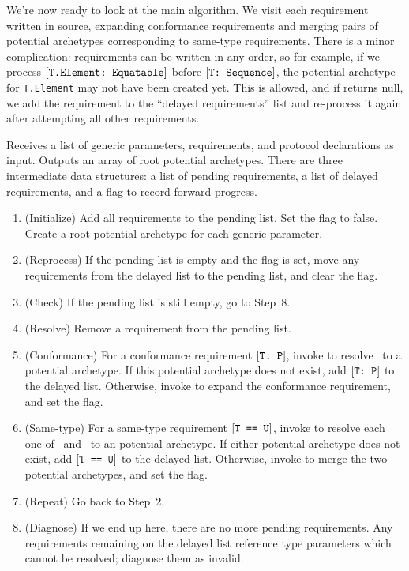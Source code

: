 \documentclass[../generics]{subfiles}
\begin{document}
We're now ready to look at the main algorithm. We visit each requirement written in source, expanding conformance requirements and merging pairs of potential archetypes corresponding to same-type requirements. There is a minor complication: requirements can be written in any order, so for example, if we process $[\texttt{T.Element:~Equatable}]$ before $[\texttt{T:~Sequence}]$, the potential archetype for \texttt{T.Element} may not have been created yet. This is allowed, and if  returns null, we add the requirement to the ``delayed requirements'' list and re-process it again after attempting all other requirements.
\begin{algorithm}\label{archetypebuilder} Receives a list of generic parameters, requirements, and protocol declarations as input. Outputs an array of root potential archetypes. There are three intermediate data structures: a list of pending requirements, a list of delayed requirements, and a flag to record forward progress.
\begin{enumerate}
\item (Initialize) Add all requirements to the pending list. Set the flag to false. Create a root potential archetype for each generic parameter.
\item (Reprocess) If the pending list is empty and the flag is set, move any requirements from the delayed list to the pending list, and clear the flag.
\item (Check) If the pending list is still empty, go to Step~8.
\item (Resolve) Remove a requirement from the pending list.
\item (Conformance) For a conformance requirement $[\texttt{T:~P}]$, invoke  to resolve \tT\ to a potential archetype. If this potential archetype does not exist, add $[\texttt{T:~P}]$ to the delayed list. Otherwise, invoke  to expand the conformance requirement, and set the flag.
\item (Same-type) For a same-type requirement $[\texttt{T == U}]$, invoke  to resolve each one of \tT\ and \tU\ to an potential archetype. If either potential archetype does not exist, add $[\texttt{T == U}]$ to the delayed list. Otherwise, invoke  to merge the two potential archetypes, and set the flag.
\item (Repeat) Go back to Step~2.
\item (Diagnose) If we end up here, there are no more pending requirements. Any requirements remaining on the delayed list reference type parameters which cannot be resolved; diagnose them as invalid.
\end{enumerate}
\end{algorithm}
\end{document}
